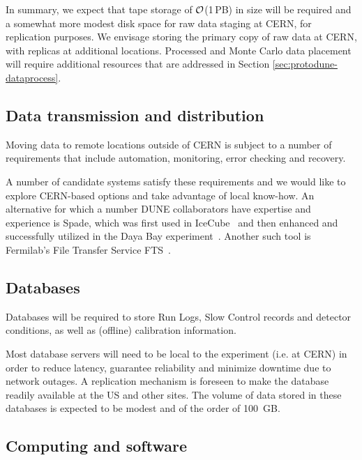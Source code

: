 In summary, we expect that tape storage of $\cal{O}$(1\,PB) in 
size will be required and a somewhat more modest disk space for raw data staging at 
CERN, for replication purposes.  We envisage storing the primary copy of raw data at CERN, with replicas at additional locations. 
%
Processed and Monte Carlo data placement will require additional resources that are addressed in Section \ref{sec:protodune-dataprocess}.


\subsection{Data transmission and distribution}
Moving data to remote locations outside of CERN is subject to a number of requirements that include
automation, monitoring, error checking and recovery. 

A number of candidate systems satisfy these requirements and we would like to explore CERN-based options and take advantage of 
local know-how. An alternative for which a number DUNE collaborators have expertise and 
experience is Spade, which was first used in IceCube~\cite{spade_icecube} and then 
enhanced and successfully utilized in the Daya Bay experiment~\cite{spade_dayabay}.  Another such tool is Fermilab's File Transfer Service FTS~\cite{fts}.


\subsection{Databases}
Databases will be required to store Run Logs, Slow Control records and detector conditions, as well as (offline) calibration information.

Most database servers will need to be local to the experiment (i.e. at CERN) in order to reduce latency, guarantee reliability and minimize
downtime due to network outages. A replication mechanism is foreseen to make the database readily available at the US and other sites.
The volume of data stored in these databases is expected to be modest and of the order of 100~GB.


\subsection{Computing and software}


